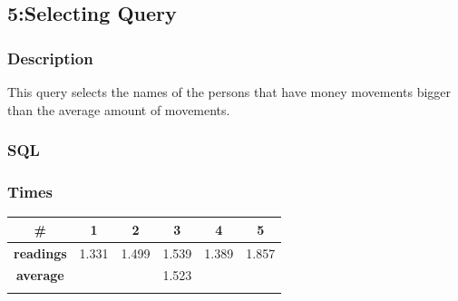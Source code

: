 \documentclass[a4paper, 10pt]{article}
\begin{document}
\subsection{5:Selecting Query}
\subsubsection{Description}
This query selects the names of the persons that have money movements bigger than the average amount of movements.
\subsubsection{SQL}
\subsubsection{Times}
\begin{table}[H]
\centering
\begin{tabular}{cccccc}
\hline
\multicolumn{1}{|c|}{\textbf{\#}}       & \multicolumn{1}{c|}{\textbf{1}} & \multicolumn{1}{c|}{\textbf{2}} & \multicolumn{1}{c|}{\textbf{3}} & \multicolumn{1}{c|}{\textbf{4}} & \multicolumn{1}{c|}{\textbf{5}} \\ \hline
\multicolumn{1}{|c|}{\textbf{readings}} & \multicolumn{1}{c|}{1.331}           & \multicolumn{1}{c|}{1.499}           & \multicolumn{1}{c|}{1.539}           & \multicolumn{1}{c|}{1.389}           & \multicolumn{1}{c|}{1.857}           \\ \hline
\multicolumn{1}{|c|}{\textbf{average}}      & \multicolumn{5}{c|}{1.523}                                                                                                                                                   \\ \hline
\textbf{}                               & \textbf{}                       & \textbf{}                       & \textbf{}                       & \textbf{}                       & \textbf{}                      
\end{tabular}
\end{table}
\end{document}
